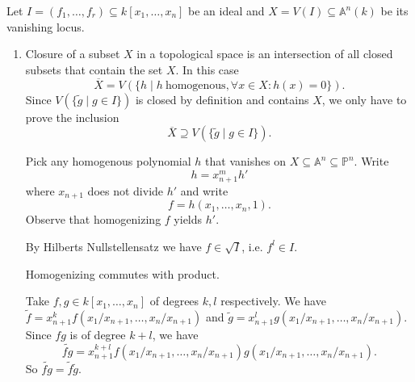 \newcommand{\sheet}{2}




\maketitle

\begin{exercise}{1}
    Let $I = (f_1, \dots, f_r) \subseteq k[x_1, \dots, x_n]$ be an ideal and $X
    = V(I) \subseteq \mathbb{A}^n(k)$ be its vanishing locus.
    \begin{enumerate}
        \item{} Closure of a subset $X$ in a topological space is an
            intersection of all closed subsets that contain the set $X$. In this
            case
            \[
                \overline{X} = V(\{h \mid h\ \text{homogenous}, \forall x \in X
                \colon h(x) = 0\}).
            \]
            Since $V(\{ \widetilde{g} \mid g \in I \})$ is closed by
            definition and contains $X$, we only have to prove the inclusion
            \begin{equation}\label{inclusion}
                \overline{X} \supseteq V(\{ \tilde{g} \mid g \in I \}).
            \end{equation}

            Pick any homogenous polynomial $h$ that vanishes on $X \subseteq \mathbb{A}^n
            \subseteq \mathbb{P}^n$. Write
            \[
                h = x^m_{n+1} h'
            \]
            where $x_{n+1}$ does not divide $h'$ and write
            \[
                f = h(x_1, \dots, x_n, 1).
            \]
            Observe that homogenizing $f$ yields $h'$.

            By Hilberts Nullstellensatz we have $f \in \sqrt{I}$, i.e. $f^l \in
            I$.
            \begin{claim}
                Homogenizing commutes with product.
            \end{claim}
            \begin{proof_claim}
                Take $f, g \in k[x_1, \dots, x_n]$ of degrees $k, l$
                respectively. We have $\widetilde{f} = x^k_{n+1} f(x_1 /
                x_{n+1}, \dots, x_n / x_{n+1})$ and $\widetilde{g} = x^l_{n+1}
                g(x_1 / x_{n+1}, \dots, x_n / x_{n+1})$. Since $fg$ is of degree
                $k + l$, we have
                \[
                    \widetilde{fg} = x^{k + l}_{n+1} f(x_1 / x_{n+1}, \dots, x_n
                    / x_{n+1}) g(x_1 / x_{n+1}, \dots, x_n / x_{n+1}).
                \]
                So $\widetilde{fg} = \widetilde{f} \widetilde{g}$.
            \end{proof_claim}


\end{enumerate}
\end{exercise}
